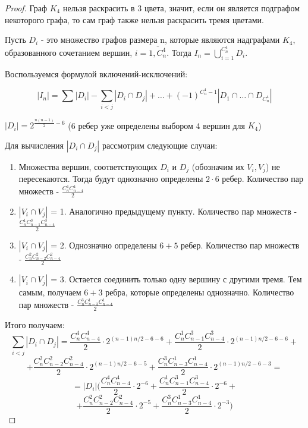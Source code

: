 \documentclass[a4paper, 12pt]{article}
\theoremstyle{definition}
\theoremstyle{remark}
\begin{document}
\begin{proof}
    Граф $K_4$ нельзя раскрасить в 3 цвета, значит, если он является подграфом некоторого графа, то сам
    граф также нельзя раскрасить тремя цветами.
    
    Пусть $D_i$ - это множество графов размера n,
    которые являются надграфами $K_4$, образованного сочетанием вершин,
    $i = \overline{1, C_n^4}$.
    Тогда $I_n = \bigcup_{i = 1}^{C_n^4} D_i$.

    Воспользуемся формулой включений-исключений:

    $$|I_n| = \sum |D_i| - \sum_{i< j} |D_i\cap D_j| + \dots + (-1)^{C_n^4-1} |D_1 \cap \dots \cap D_{C_n^4}|$$
    
    $|D_i| = 2^{\frac{n(n-1)}{2}-6}$ (6 ребер уже определены выбором 4 вершин для $K_4$)

    Для вычисления $|D_i\cap D_j|$ рассмотрим следующие случаи:
    
    \begin{enumerate}
        \item Множества вершин, соответствующих $D_i$ и $D_j$ (обозначим их $V_i, V_j$) не пересекаются.
        Тогда будут однозначно определены $2\cdot 6 $ ребер. Количество пар множеств - $\frac{C_n^4C_{n-4}^4}{2}$
        \item $|V_i\cap V_j|$ = 1. Аналогично предыдущему пункту. Количество пар множеств - $\frac{C_n^1C_{n-1}^3 C_{n-4}^3}{2}$
        \item $|V_i\cap V_j|$ = 2. Однозначно определены $6+5$ ребер. Количество пар множеств - $\frac{C_n^2C_{n-2}^2 C_{n-4}^2}{2}$
        \item $|V_i\cap V_j|$ = 3. Остается соединить только одну вершину с другими тремя. Тем самым, получаем $6+3$ ребра, которые определены
        однозначно. Количество пар множеств - $\frac{C_n^3C_{n-3}^1 C_{n-4}^1}{2}$
    \end{enumerate}
    Итого получаем: $$\sum_{i< j} |D_i\cap D_j| = \frac{C_n^4C_{n-4}^4}{2} \cdot 2^{(n-1)n/2 - 6 - 6} + \frac{C_n^1C_{n-1}^3 C_{n-4}^3}{2}  \cdot 2^{(n-1)n/2 - 6 - 6} + $$
    $$  + \frac{C_n^2C_{n-2}^2 C_{n-4}^2}{2} \cdot 2^{(n-1)n/2 - 6 - 5}  + \frac{C_n^3C_{n-3}^1 C_{n-4}^1}{2} \cdot 2^{(n-1)n/2 - 6 - 3} = $$
    $$ = |D_i| (\frac{C_n^4C_{n-4}^4}{2} \cdot 2^{-6} + \frac{C_n^1C_{n-1}^3 C_{n-4}^3}{2}  \cdot 2^{-6} + $$
    $$+ \frac{C_n^2C_{n-2}^2 C_{n-4}^2}{2} \cdot 2^{- 5}  + \frac{C_n^3C_{n-3}^1 C_{n-4}^1}{2} \cdot 2^{- 3})$$

\end{proof}
\end{document}
